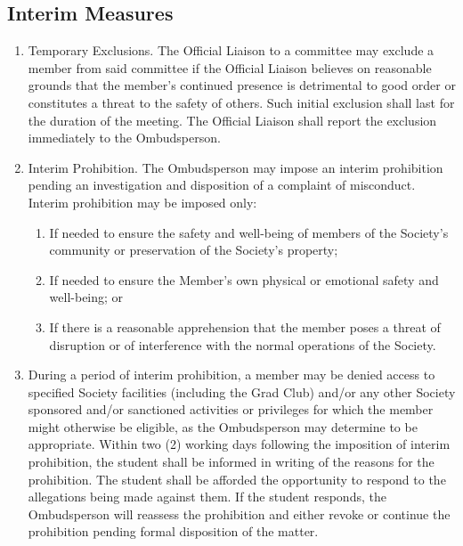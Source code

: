 \subsection{Interim Measures}
\begin{enumerate} [align=left]
\item Temporary Exclusions. The Official Liaison to a committee may exclude a member from said committee if the Official Liaison believes on reasonable grounds that the member's continued presence is detrimental to good order or constitutes a threat to the safety of others. Such initial exclusion shall last for the duration of the meeting. The Official Liaison shall report the exclusion immediately to the Ombudsperson.
\item Interim Prohibition. The Ombudsperson may impose an interim prohibition pending an investigation and disposition of a complaint of misconduct. Interim prohibition may be imposed only:
\begin{enumerate} [label*=\arabic*., align=left]
\item If needed to ensure the safety and well-being of members of the Society's community or preservation of the Society's property;
\item If needed to ensure the Member's own physical or emotional safety and well-being; or
\item If there is a reasonable apprehension that the member poses a threat of disruption or of interference with the normal operations of the Society.
\end{enumerate}
\item During a period of interim prohibition, a member may be denied access to specified Society facilities (including the Grad Club) and/or any other Society sponsored and/or sanctioned activities or privileges for which the member might otherwise be eligible, as the Ombudsperson may determine to be appropriate. Within two (2) working days following the imposition of interim prohibition, the student shall be informed in writing of the reasons for the prohibition. The student shall be afforded the opportunity to respond to the allegations being made against them. If the student responds, the Ombudsperson will reassess the prohibition and either revoke or continue the prohibition pending formal disposition of the matter.
\end{enumerate}

